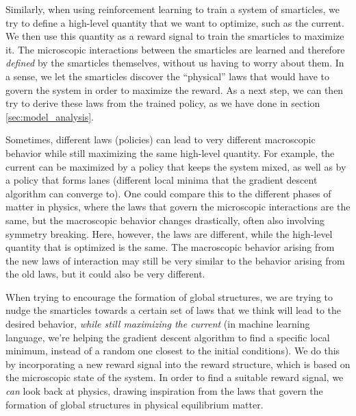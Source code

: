 Similarly, when using reinforcement learning to train a system of smarticles, we try to define a high-level quantity that we want to optimize, such as the current. We then use this quantity as a reward signal to train the smarticles to maximize it. The microscopic interactions between the smarticles are learned and therefore \textit{defined} by the smarticles themselves, without us having to worry about them. In a sense, we let the smarticles discover the \enquote{physical} laws that would have to govern the system in order to maximize the reward. As a next step, we can then try to derive these laws from the trained policy, as we have done in section \ref{sec:model_analysis}.


Sometimes, different laws (policies) can lead to very different macroscopic behavior while still maximizing the same high-level quantity. For example, the current can be maximized by a policy that keeps the system mixed, as well as by a policy that forms lanes (different local minima that the gradient descent algorithm can converge to). One could compare this to the different phases of matter in physics, where the laws that govern the microscopic interactions are the same, but the macroscopic behavior changes drastically, often also involving symmetry breaking. Here, however, the laws are different, while the high-level quantity that is optimized is the same. The macroscopic behavior arising from the new laws of interaction may still be very similar to the behavior arising from the old laws, but it could also be very different. 


When trying to encourage the formation of global structures, we are trying to nudge the smarticles towards a certain set of laws that we think will lead to the desired behavior, \textit{while still maximizing the current} (in machine learning language, we're helping the gradient descent algorithm to find a specific local minimum, instead of a random one closest to the initial conditions). We do this by incorporating a new reward signal into the reward structure, which is based on the microscopic state of the system. In order to find a suitable reward signal, we \textit{can} look back at physics, drawing inspiration from the laws that govern the formation of global structures in physical equilibrium matter.

